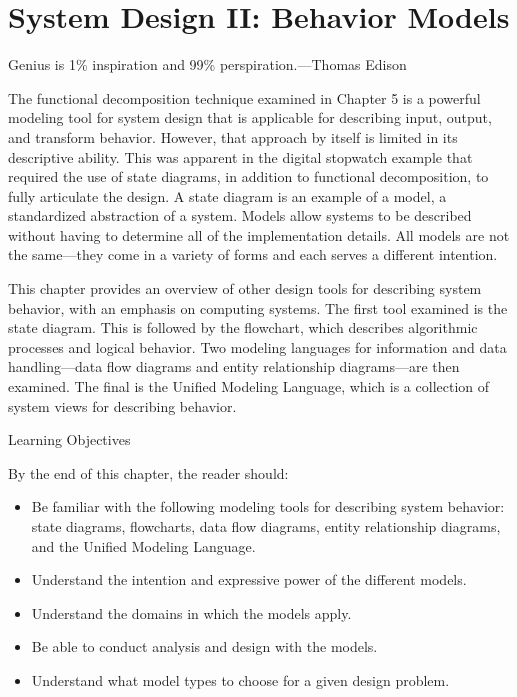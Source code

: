 \section{System Design II: Behavior
Models}\label{system-design-ii-behavior-models}

Genius is 1\% inspiration and 99\% perspiration.---Thomas Edison

The functional decomposition technique examined in Chapter 5 is a
powerful modeling tool for system design that is applicable for
describing input, output, and transform behavior. However, that approach
by itself is limited in its descriptive ability. This was apparent in
the digital stopwatch example that required the use of state diagrams,
in addition to functional decomposition, to fully articulate the design.
A state diagram is an example of a model, a standardized abstraction of
a system. Models allow systems to be described without having to
determine all of the implementation details. All models are not the
same---they come in a variety of forms and each serves a different
intention.

This chapter provides an overview of other design tools for describing
system behavior, with an emphasis on computing systems. The first tool
examined is the state diagram. This is followed by the flowchart, which
describes algorithmic processes and logical behavior. Two modeling
languages for information and data handling---data flow diagrams and
entity relationship diagrams---are then examined. The final is the
Unified Modeling Language, which is a collection of system views for
describing behavior.

Learning Objectives

By the end of this chapter, the reader should:

\begin{itemize}
\item
  Be familiar with the following modeling tools for describing system
  behavior: state diagrams, flowcharts, data flow diagrams, entity
  relationship diagrams, and the Unified Modeling Language.
\item
  Understand the intention and expressive power of the different models.
\item
  Understand the domains in which the models apply.
\item
  Be able to conduct analysis and design with the models.
\item
  Understand what model types to choose for a given design problem.
\end{itemize}

